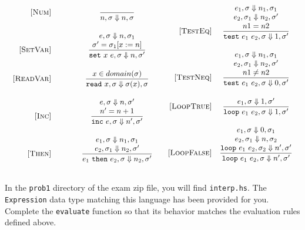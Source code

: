 \documentclass[addpoints]{exam}
\begin{document}
\begin{questions}
\[
  \begin{array}{c@{\quad}c}
  \begin{array}{r@{\qquad\qquad}c}

\ssrule{Num}{}{
  \bstepStore{n}{\sigma}{n}{\sigma}
}

\ssrule{SetVar}{
  \bstepStore{e}{\sigma}{n}{\sigma_1} \\
  \sigma' = \sigma_1[x:=n]
}{
  \bstepStore{\setexp x e}{\sigma}{n}{\sigma'}
}

\ssrule{ReadVar}{
  x \in domain(\sigma)
}{
  \bstepStore{\readexp x}{\sigma}{\sigma(x)}{\sigma}
}

\ssrule{Inc}{
  \bstepStore{e}{\sigma}{n}{\sigma'} \\
  n' = n+1
}{
  \bstepStore{\incexp e}{\sigma}{n'}{\sigma'}
}

\ssrule{Then}{
  \bstepStore{e_1}{\sigma}{n_1}{\sigma_1} \\
  \bstepStore{e_2}{\sigma_1}{n_2}{\sigma'}
}{
  \bstepStore{\thenexp{e_1}{e_2}}{\sigma}{n_2}{\sigma'}
}

  \end{array}
  &
  \begin{array}{r@{\quad}c}

\ssrule{TestEq}{
  \bstepStore{e_1}{\sigma}{n_1}{\sigma_1} \\
  \bstepStore{e_2}{\sigma_1}{n_2}{\sigma'} \\
  n1 = n2
}{
  \bstepStore{\testexp{e_1}{e_2}}{\sigma}{1}{\sigma'}
}

\ssrule{TestNeq}{
  \bstepStore{e_1}{\sigma}{n_1}{\sigma_1} \\
  \bstepStore{e_2}{\sigma_1}{n_2}{\sigma'} \\
  n1 \neq n2
}{
  \bstepStore{\testexp{e_1}{e_2}}{\sigma}{0}{\sigma'}
}

\ssrule{LoopTrue}{
  \bstepStore{e_1}{\sigma}{1}{\sigma'}
}{
  \bstepStore{\loopexp{e_1}{e_2}}{\sigma}{1}{\sigma'}
}

\ssrule{LoopFalse}{
  \bstepStore{e_1}{\sigma}{0}{\sigma_1} \\
  \bstepStore{e_2}{\sigma_1}{n}{\sigma_2} \\
  \bstepStore{\loopexp{e_1}{e_2}}{\sigma_2}{n'}{\sigma'}
}{
  \bstepStore{\loopexp{e_1}{e_2}}{\sigma}{n'}{\sigma'}
}

\end{array}
\end{array}
\]

In the {\tt prob1} directory of the exam zip file, you will find {\tt interp.hs}.
The {\tt Expression} data type matching this language has been provided for you.
Complete the {\tt evaluate} function so that its behavior
matches the evaluation rules defined above.


\end{questions}
\end{document}
